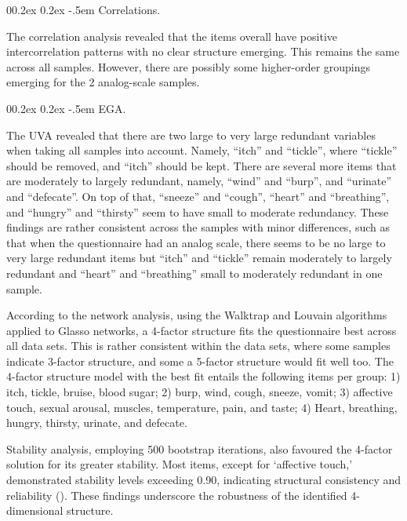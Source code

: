 \documentclass[
  man,
  floatsintext,
  longtable,
  nolmodern,
  notxfonts,
  notimes,
  colorlinks=true,linkcolor=blue,citecolor=blue,urlcolor=blue]{apa7}
\makeatletter
\renewcommand{\paragraph}{\@startsection{paragraph}{4}{\parindent}%
	{0\baselineskip \@plus 0.2ex \@minus 0.2ex}%
	{-.5em}%
	{\normalfont\normalsize\bfseries\typesectitle}}
\makeatother
\begin{document}
\paragraph{Correlations.}\label{correlations}

The correlation analysis revealed that the items overall have positive
intercorrelation patterns with no clear structure emerging. This remains
the same across all samples. However, there are possibly some
higher-order groupings emerging for the 2 analog-scale samples.

\paragraph{EGA.}\label{ega}

The UVA revealed that there are two large to very large redundant
variables when taking all samples into account. Namely, ``itch'' and
``tickle'', where ``tickle'' should be removed, and ``itch'' should be
kept. There are several more items that are moderately to largely
redundant, namely, ``wind'' and ``burp'', and ``urinate'' and
``defecate''. On top of that, ``sneeze'' and ``cough'', ``heart'' and
``breathing'', and ``hungry'' and ``thirsty'' seem to have small to
moderate redundancy. These findings are rather consistent across the
samples with minor differences, such as that when the questionnaire had
an analog scale, there seems to be no large to very large redundant
items but ``itch'' and ``tickle'' remain moderately to largely redundant
and ``heart'' and ``breathing'' small to moderately redundant in one
sample.

According to the network analysis, using the Walktrap and Louvain
algorithms applied to Glasso networks, a 4-factor structure fits the
questionnaire best across all data sets. This is rather consistent
within the data sets, where some samples indicate 3-factor structure,
and some a 5-factor structure would fit well too. The 4-factor structure
model with the best fit entails the following items per group: 1) itch,
tickle, bruise, blood sugar; 2) burp, wind, cough, sneeze, vomit; 3)
affective touch, sexual arousal, muscles, temperature, pain, and taste;
4) Heart, breathing, hungry, thirsty, urinate, and defecate.

Stability analysis, employing 500 bootstrap iterations, also favoured
the 4-factor solution for its greater stability. Most items, except for
`affective touch,' demonstrated stability levels exceeding 0.90,
indicating structural consistency and reliability
(). These
findings underscore the robustness of the identified 4-dimensional
structure.
\end{document}
